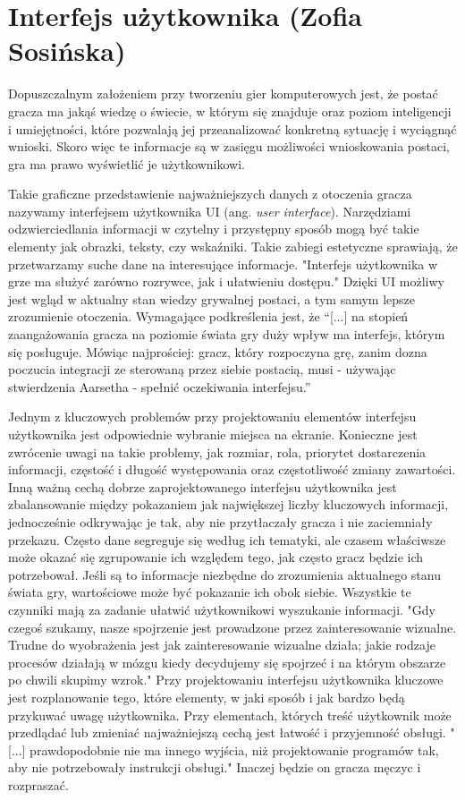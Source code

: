 \section{Interfejs użytkownika (Zofia Sosińska)}\label{c:elem_ui}

Dopuszczalnym założeniem przy tworzeniu gier komputerowych jest, że postać gracza ma jakąś wiedzę o świecie, w którym się znajduje oraz
poziom inteligencji i umiejętności, które pozwalają jej przeanalizować konkretną sytuację i wyciągnąć wnioski. Skoro więc te informacje są w zasięgu możliwości wnioskowania postaci, gra ma prawo wyświetlić je użytkownikowi. 

Takie graficzne przedstawienie najważniejszych danych z otoczenia gracza nazywamy interfejsem użytkownika UI (ang. \textit{user interface}). Narzędziami odzwierciedlania informacji
w czytelny i przystępny sposób mogą być takie elementy jak obrazki, teksty, czy wskaźniki. Takie zabiegi estetyczne sprawiają, że przetwarzamy suche dane
na interesujące informacje. "Interfejs użytkownika w grze ma służyć zarówno rozrywce, jak i ułatwieniu dostępu."\cite{projektowanie_podstawy}
Dzięki UI możliwy jest wgląd w aktualny stan wiedzy grywalnej postaci, a tym samym lepsze
zrozumienie otoczenia. Wymagające podkreślenia jest, że “[...] na stopień zaangażowania gracza na poziomie świata gry duży wpływ ma interfejs, którym się posługuje. Mówiąc najprościej:
gracz, który rozpoczyna grę, zanim dozna poczucia integracji ze sterowaną przez siebie postacią, musi - używając stwierdzenia Aarsetha - spełnić oczekiwania interfejsu.”\cite{olbrzymwcieniu}

Jednym z kluczowych problemów przy projektowaniu elementów interfejsu użytkownika jest odpowiednie wybranie miejsca na ekranie. Konieczne jest zwrócenie uwagi na takie 
problemy, jak  rozmiar, rola, priorytet dostarczenia informacji, częstość i długość występowania oraz częstotliwość zmiany zawartości.
Inną ważną cechą dobrze zaprojektowanego interfejsu użytkownika jest zbalansowanie między pokazaniem jak największej liczby kluczowych informacji, 
jednocześnie odkrywając je tak, aby nie przytłaczały gracza i nie zaciemniały przekazu.
Często dane segreguje się według ich tematyki, ale czasem właściwsze może okazać się zgrupowanie ich 
względem tego, jak często gracz będzie ich potrzebował. Jeśli są to informacje niezbędne do zrozumienia aktualnego 
stanu świata gry, wartościowe może być pokazanie ich obok siebie. Wszystkie te czynniki mają za zadanie ułatwić użytkownikowi
wyszukanie informacji. "Gdy czegoś szukamy, nasze spojrzenie jest prowadzone przez zainteresowanie wizualne.
Trudne do wyobrażenia jest jak zainteresowanie wizualne działa; jakie rodzaje procesów działają w mózgu kiedy decydujemy się spojrzeć i na
którym obszarze po chwili skupimy wzrok."\cite{user_interfaces} Przy projektowaniu interfejsu użytkownika kluczowe jest rozplanowanie
tego, które elementy, w jaki sposób i jak bardzo będą przykuwać uwagę użytkownika. Przy elementach, których treść użytkownik może przedlądać
lub zmieniać najważniejszą cechą jest łatwość i przyjemność obsługi. "[...] prawdopodobnie nie ma innego wyjścia, niż projektowanie programów tak,
 aby nie potrzebowały instrukcji obsługi."\cite{ui_for_programmers} Inaczej będzie on gracza męczyc i rozpraszać.

